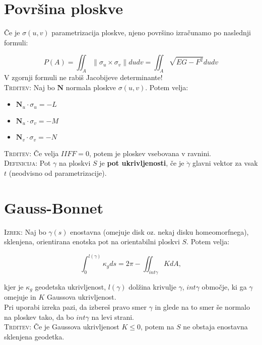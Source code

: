 \documentclass[8pt,a4paper]{amsart}
\theoremstyle{definition} %
\theoremstyle{plain} %
\begin{document}
\section*{\textbf{Površina ploskve}} %

Če je $\sigma (u,v)$ parametrizacija ploskve, njeno površino izračunamo po naslednji formuli:

$$
P(A) = \iint_{A} \| \sigma_u \times \sigma_v \| du dv = \iint_A \sqrt{EG-F^2} dudv
$$
V zgornji formuli ne rabiš Jacobijeve determinante!
\\

\textsc{Trditev: }Naj bo $\textbf{N}$ normala ploskve $\sigma (u,v)$. Potem velja:

\begin{itemize}

\item $\textbf{N}_u \cdot \sigma_u = -L$
\item $\textbf{N}_u \cdot \sigma_v = -M$
\item $\textbf{N}_v \cdot \sigma_v = -N$
\end{itemize}

\textsc{Trditev: }Če velja $IIFF = 0$, potem je ploskev vsebovana v ravnini.
\\

\textsc{Definicija:} Pot $\gamma$ na ploskvi $S$ je \textbf{pot ukrivljenosti}, če je $\dot{\gamma}$ glavni vektor za vsak $t$ (neodvisno od parametrizacije).

\section*{\textbf{Gauss-Bonnet}}  %

\textsc{Izrek:} Naj bo $\gamma (s)$ enostavna (omejuje disk oz. nekaj disku homeomorfnega), sklenjena, orientirana enotska pot na orientabilni ploskvi $S$. Potem velja:

$$
\int_0^{l(\gamma)}\kappa_g ds = 2 \pi - \iint_{int \gamma} K dA,
$$

kjer je $\kappa_g$ geodetska ukrivljenost, $l(\gamma)$ dolžina krivulje $\gamma$, $int \gamma$ območje, ki ga $\gamma$ omejuje in $K$ Gaussova ukrivljenost.
\\

Pri uporabi izreka pazi, da izbereš pravo smer $\gamma$ in glede na to smer še normalo na ploskev tako, da bo $int \gamma$ na levi strani.
\\

\textsc{Trditev: }Če je Gaussova ukrivljenost $K \leq 0$, potem na $S$ ne obstaja enostavna sklenjena geodetka.
\\
\end{document}
